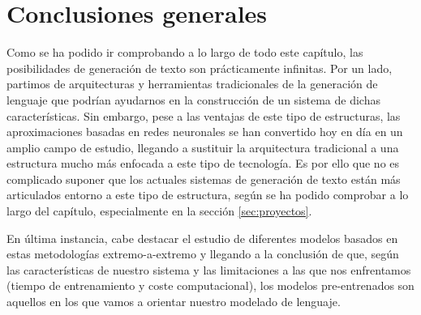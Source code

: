 \section{Conclusiones generales}
\label{sec:2conclusionesgenerales}
Como se ha podido ir comprobando a lo largo de todo este capítulo, las posibilidades de generación de texto son prácticamente infinitas. Por un lado, partimos de arquitecturas y herramientas tradicionales de la generación de lenguaje que podrían ayudarnos en la construcción de un sistema de dichas características. Sin embargo, pese a las ventajas de este tipo de estructuras, las aproximaciones basadas en redes neuronales se han convertido hoy en día en un amplio campo de estudio, llegando a sustituir la arquitectura tradicional a una estructura mucho más enfocada a este tipo de tecnología. 
Es por ello que no es complicado suponer que los actuales sistemas de generación de texto están más articulados entorno a este tipo de estructura, según se ha podido comprobar a lo largo del capítulo, especialmente en la sección \ref{sec:proyectos}.  

En última instancia, cabe destacar el estudio de diferentes modelos basados en estas metodologías extremo-a-extremo y llegando a la conclusión de que, según las características de nuestro sistema y las limitaciones a las que nos enfrentamos (tiempo de entrenamiento y coste computacional), los modelos pre-entrenados son aquellos en los que vamos a orientar nuestro modelado de lenguaje. 

